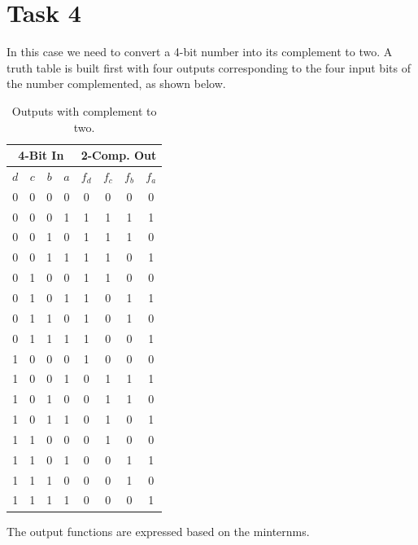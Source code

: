
\section*{Task 4}
    In this case we need to convert a 4-bit number into its complement 
    to two. A truth table is built first with four outputs corresponding 
    to the four input bits of the number complemented, as shown below.
    \begin{table}[H]
        \begin{center}
        \begin{tabular}{|c|c|c|c||c|c|c|c|}
        \hline
        \multicolumn{4}{|c||}{4-Bit In} & \multicolumn{4}{|c|}{2-Comp. Out}
        \\ \hline
        $d$ & $c$ & $b$ & $a$ & $f_{d}$ & $f_{c}$ & $f_{b}$ & $f_{a}$\\
        \hline \hline
        0 & 0 & 0 & 0 & 0 & 0 & 0 & 0\\ \hline
        0 & 0 & 0 & 1 & 1 & 1 & 1 & 1\\ \hline
        0 & 0 & 1 & 0 & 1 & 1 & 1 & 0\\ \hline
        0 & 0 & 1 & 1 & 1 & 1 & 0 & 1\\ \hline
        0 & 1 & 0 & 0 & 1 & 1 & 0 & 0\\ \hline
        0 & 1 & 0 & 1 & 1 & 0 & 1 & 1\\ \hline
        0 & 1 & 1 & 0 & 1 & 0 & 1 & 0\\ \hline
        0 & 1 & 1 & 1 & 1 & 0 & 0 & 1\\ \hline
        1 & 0 & 0 & 0 & 1 & 0 & 0 & 0\\ \hline
        1 & 0 & 0 & 1 & 0 & 1 & 1 & 1\\ \hline
        1 & 0 & 1 & 0 & 0 & 1 & 1 & 0\\ \hline
        1 & 0 & 1 & 1 & 0 & 1 & 0 & 1\\ \hline
        1 & 1 & 0 & 0 & 0 & 1 & 0 & 0\\ \hline
        1 & 1 & 0 & 1 & 0 & 0 & 1 & 1\\ \hline
        1 & 1 & 1 & 0 & 0 & 0 & 1 & 0\\ \hline
        1 & 1 & 1 & 1 & 0 & 0 & 0 & 1\\ \hline
        \end{tabular}
        \caption{Outputs with complement to two.}
        \end{center}
        \end{table}
        \par
        The output functions are expressed based on the minternms.
